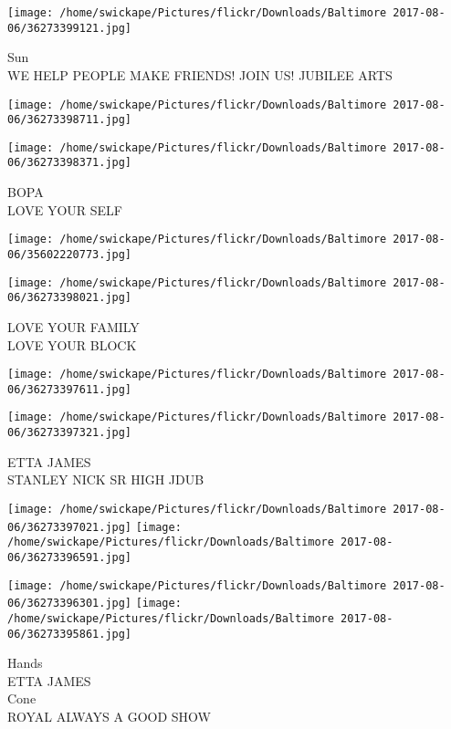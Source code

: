 \documentclass[10pt,letterpaper]{article}
\begin{document}
\vspace{0.25in}
\texttt{[image: /home/swickape/Pictures/flickr/Downloads/Baltimore 2017-08-06/36273399121.jpg]}

Sun\\
WE HELP PEOPLE MAKE FRIENDS!  JOIN US!  JUBILEE ARTS\\
\pagebreak

\texttt{[image: /home/swickape/Pictures/flickr/Downloads/Baltimore 2017-08-06/36273398711.jpg]}

\vspace{0.25in}
\texttt{[image: /home/swickape/Pictures/flickr/Downloads/Baltimore 2017-08-06/36273398371.jpg]}

BOPA\\
LOVE YOUR SELF\\
\pagebreak

\texttt{[image: /home/swickape/Pictures/flickr/Downloads/Baltimore 2017-08-06/35602220773.jpg]}

\vspace{0.25in}
\texttt{[image: /home/swickape/Pictures/flickr/Downloads/Baltimore 2017-08-06/36273398021.jpg]}

LOVE YOUR FAMILY\\
LOVE YOUR BLOCK\\
\pagebreak

\texttt{[image: /home/swickape/Pictures/flickr/Downloads/Baltimore 2017-08-06/36273397611.jpg]}

\vspace{0.25in}
\texttt{[image: /home/swickape/Pictures/flickr/Downloads/Baltimore 2017-08-06/36273397321.jpg]}

ETTA JAMES\\
STANLEY NICK SR HIGH JDUB\\
\pagebreak

\texttt{[image: /home/swickape/Pictures/flickr/Downloads/Baltimore 2017-08-06/36273397021.jpg]}
\texttt{[image: /home/swickape/Pictures/flickr/Downloads/Baltimore 2017-08-06/36273396591.jpg]}

\texttt{[image: /home/swickape/Pictures/flickr/Downloads/Baltimore 2017-08-06/36273396301.jpg]}
\texttt{[image: /home/swickape/Pictures/flickr/Downloads/Baltimore 2017-08-06/36273395861.jpg]}

Hands\\
ETTA JAMES\\
Cone\\
ROYAL ALWAYS A GOOD SHOW\\
\pagebreak
\end{document}
